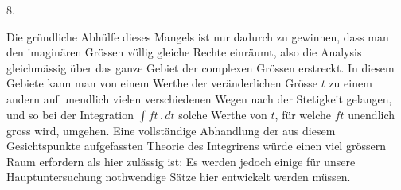 \clearpage{}
\begin{center}8.\end{center}
\noindent\hspace*{\parindent}Die gründliche Abhülfe dieses Mangels ist nur dadurch zu gewinnen, dass man den imaginären Grössen völlig gleiche Rechte einräumt, also die Analysis gleichmässig über das ganze Gebiet der complexen Grössen erstreckt. In diesem Gebiete kann man von einem Werthe der veränderlichen Grösse \(t\) zu einem andern auf unendlich vielen verschiedenen Wegen nach der Stetigkeit gelangen, und so bei der Integration \(\int ft\,{.}\,dt\) solche Werthe von \(t\), für welche \(ft\) unendlich gross wird, umgehen. Eine vollständige Abhandlung der aus diesem Gesichtspunkte aufgefassten Theorie des Integrirens würde einen viel grössern Raum erfordern als hier zulässig ist: Es werden jedoch einige für unsere Hauptuntersuchung nothwendige Sätze hier entwickelt werden müssen.

